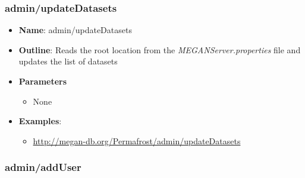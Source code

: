 \documentclass[11pt]{article}
\begin{document}
\subsubsection{admin/updateDatasets}
\label{subsubsec:upProp}
\begin{itemize}
	\item \textbf{Name}: admin/updateDatasets
	\item \textbf{Outline}: Reads the root location from the \textit{MEGANServer.properties} file and updates the list of datasets
	\item \textbf{Parameters}
		\begin{itemize}
			\item  None
		\end{itemize}
	\item \textbf{Examples}:
		\begin{itemize}
			\item \url{http://megan-db.org/Permafrost/admin/updateDatasets}
		\end{itemize}
\end{itemize}



\subsubsection{admin/addUser}
\end{document}
